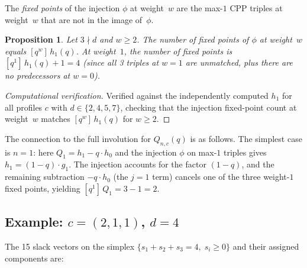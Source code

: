 \documentclass[11pt]{article}
\newtheorem{proposition}[theorem]{Proposition}
\begin{document}
The \emph{fixed points} of the injection $\phi$ at weight~$w$ are the max-$1$
CPP triples at weight~$w$ that are not in the image of~$\phi$.

\begin{proposition}
\label{prop:fixed-pts}
Let $3 \nmid d$ and $w \geq 2$. The number of fixed points of $\phi$ at
weight~$w$ equals $[q^w]\,h_1(q)$.
At weight~$1$, the number of fixed points is $[q^1]\,h_1(q) + 1 = 4$
(since all 3 triples at $w = 1$ are unmatched, plus there are no predecessors
at $w = 0$).
\end{proposition}

\begin{proof}[Computational verification]
Verified against the independently computed $h_1$ for all profiles
$c$ with $d \in \{2, 4, 5, 7\}$, checking that the injection fixed-point
count at weight~$w$ matches $[q^w]\,h_1(q)$ for $w \geq 2$.
\end{proof}

The connection to the full involution for $Q_{n,c}(q)$ is as follows.
The simplest case is $n = 1$: here $Q_1 = h_1 - q \cdot h_0$ and the
injection $\phi$ on max-$1$ triples gives $h_1 = (1 - q) \cdot g_1$.
The injection accounts for the factor $(1-q)$, and the remaining subtraction
$-q \cdot h_0$ (the $j = 1$ term) cancels one of the three weight-$1$ fixed
points, yielding $[q^1]\,Q_1 = 3 - 1 = 2$.

\subsection{Example: $c = (2,1,1)$, $d = 4$}

The 15 slack vectors on the simplex $\{s_1 + s_2 + s_3 = 4,\; s_i \geq 0\}$
and their assigned components are:
\end{document}
